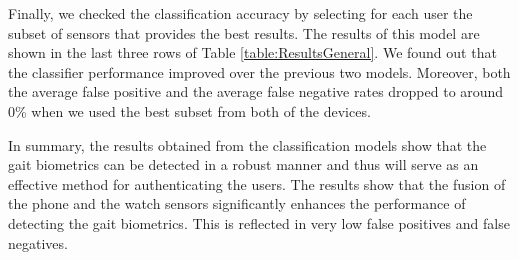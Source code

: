 Finally, we checked the classification accuracy by selecting for each user the subset of 
sensors that provides the best results. The results of this model are shown in the last three 
rows of Table \ref{table:ResultsGeneral}. 
We found out that the classifier performance improved over 
the previous two models. Moreover, both the average false positive and the average false 
negative rates dropped to around 0\% when we used the best subset from both of the devices.




In summary, the results obtained from the classification models show that the gait biometrics can be detected in a robust manner and thus will serve as an effective method for authenticating the users.
The results show that the fusion of the phone and the watch sensors significantly enhances the performance of detecting the gait biometrics.
This is reflected in very low false positives and false negatives. 
 













